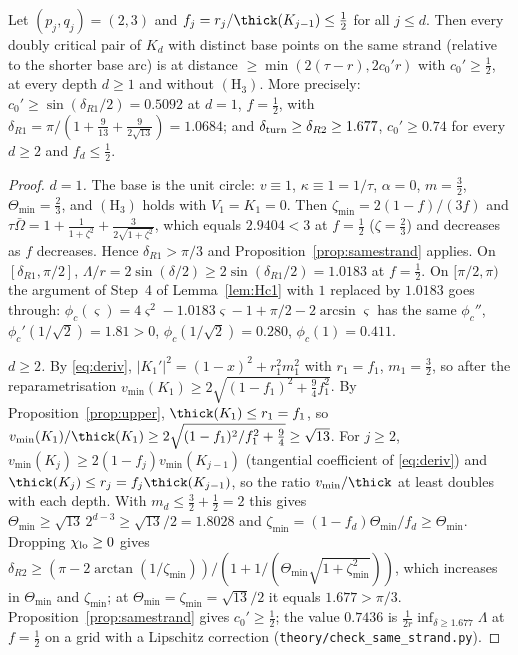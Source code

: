 \begin{corollary}\label{cor:samefamily}
Let $(p_j,q_j)=(2,3)$ and $f_j=r_j/\thick(K_{j-1})\le\frac12$ for all $j\le d$. Then every doubly critical pair of $K_d$
with distinct base points on the same strand (relative to the shorter base arc) is at distance
$\ge\min(2(\tau-r),2c_0'r)$ with $c_0'\ge\frac12$, at every depth $d\ge1$ and without $(\mathrm H_3)$. More precisely:
$c_0'\ge\sin(\delta_{R1}/2)=0.5092$ at $d=1$, $f=\frac12$, with $\delta_{R1}=\pi/(1+\frac9{13}+\frac9{2\sqrt{13}})=1.0684$;
and $\delta_{\rm turn}\ge\delta_{R2}\ge1.677$, $c_0'\ge0.74$ for every $d\ge2$ and $f_d\le\frac12$.
\end{corollary}
\begin{proof}
\emph{$d=1$.} The base is the unit circle: $v\equiv1$, $\kappa\equiv1=1/\tau$, $\alpha=0$, $m=\frac32$,
$\Theta_{\min}=\frac23$, and $(\mathrm H_3)$ holds with $V_1=K_1=0$. Then $\zeta_{\min}=2(1-f)/(3f)$ and
$\tau\bar\Omega=1+\frac1{1+\zeta^2}+\frac{3}{2\sqrt{1+\zeta^2}}$, which equals $2.9404<3$ at $f=\frac12$
($\zeta=\frac23$) and decreases as $f$ decreases. Hence $\delta_{R1}>\pi/3$ and Proposition~\ref{prop:samestrand}
applies. On $[\delta_{R1},\pi/2]$, $\Lambda/r=2\sin(\delta/2)\ge2\sin(\delta_{R1}/2)=1.0183$ at $f=\frac12$. On $[\pi/2,\pi)$
the argument of Step~4 of Lemma~\ref{lem:Hc1} with $1$ replaced by $1.0183$ goes through:
$\phi_c(\varsigma)=4\varsigma^2-1.0183\varsigma-1+\pi/2-2\arcsin\varsigma$ has the same $\phi_c''$,
$\phi_c'(1/\sqrt2)=1.81>0$, $\phi_c(1/\sqrt2)=0.280$, $\phi_c(1)=0.411$.

\emph{$d\ge2$.} By \eqref{eq:deriv}, $|K_1'|^2=(1-x)^2+r_1^2m_1^2$ with $r_1=f_1$, $m_1=\frac32$, so after the
reparametrisation $v_{\min}(K_1)\ge2\sqrt{(1-f_1)^2+\frac94f_1^2}$. By Proposition~\ref{prop:upper},
$\thick(K_1)\le r_1=f_1$, so $v_{\min}(K_1)/\thick(K_1)\ge2\sqrt{(1-f_1)^2/f_1^2+\frac94}\ge\sqrt{13}$. For $j\ge2$,
$v_{\min}(K_j)\ge2(1-f_j)v_{\min}(K_{j-1})$ (tangential coefficient of \eqref{eq:deriv}) and
$\thick(K_j)\le r_j=f_j\thick(K_{j-1})$, so the ratio $v_{\min}/\thick$ at least doubles with each depth. With
$m_d\le\frac32+\frac12=2$ this gives $\Theta_{\min}\ge\sqrt{13}\,2^{d-3}\ge\sqrt{13}/2=1.8028$ and
$\zeta_{\min}=(1-f_d)\Theta_{\min}/f_d\ge\Theta_{\min}$. Dropping $\chi_{\rm lo}\ge0$ gives
$\delta_{R2}\ge(\pi-2\arctan(1/\zeta_{\min}))/(1+1/(\Theta_{\min}\sqrt{1+\zeta_{\min}^2}))$, which increases in
$\Theta_{\min}$ and $\zeta_{\min}$; at $\Theta_{\min}=\zeta_{\min}=\sqrt{13}/2$ it equals $1.677>\pi/3$. Proposition~\ref{prop:samestrand}
gives $c_0'\ge\frac12$; the value $0.7436$ is $\frac1{2r}\inf_{\delta\ge1.677}\Lambda$ at $f=\frac12$ on a grid with a
Lipschitz correction (\texttt{theory/check\_same\_strand.py}).
\end{proof}

